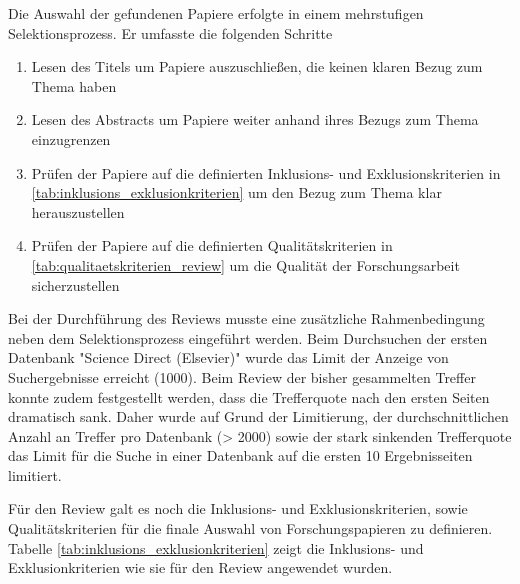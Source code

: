 Die Auswahl der gefundenen Papiere erfolgte in einem mehrstufigen Selektionsprozess. Er umfasste die folgenden Schritte

\begin{enumerate}
    \item Lesen des Titels um Papiere auszuschließen, die keinen klaren Bezug zum Thema haben
    \item Lesen des Abstracts um Papiere weiter anhand ihres Bezugs zum Thema einzugrenzen
    \item Prüfen der Papiere auf die definierten Inklusions- und Exklusionskriterien in \ref{tab:inklusions_exklusionkriterien} um den Bezug zum Thema klar herauszustellen
    \item Prüfen der Papiere auf die definierten Qualitätskriterien in \ref{tab:qualitaetskriterien_review} um die Qualität der Forschungsarbeit sicherzustellen
\end{enumerate}

Bei der Durchführung des Reviews musste eine zusätzliche Rahmenbedingung neben dem Selektionsprozess eingeführt werden. Beim Durchsuchen der ersten Datenbank "Science Direct (Elsevier)" wurde das Limit der Anzeige von Suchergebnisse erreicht (1000). Beim Review der bisher gesammelten Treffer konnte zudem festgestellt werden, dass die Trefferquote nach den ersten Seiten dramatisch sank. Daher wurde auf Grund der Limitierung, der durchschnittlichen Anzahl an Treffer pro Datenbank (> 2000) sowie der stark sinkenden Trefferquote das Limit für die Suche in einer Datenbank auf die ersten 10 Ergebnisseiten limitiert.

Für den Review galt es noch die Inklusions- und Exklusionskriterien, sowie Qualitätskriterien für die finale Auswahl von Forschungspapieren zu definieren. Tabelle \ref{tab:inklusions_exklusionkriterien} zeigt die Inklusions- und Exklusionkriterien wie sie für den Review angewendet wurden.

